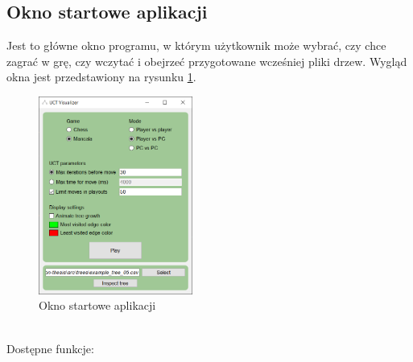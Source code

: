 \documentclass{article}
\begin{document}
\subsection{Okno startowe aplikacji}
Jest to główne okno programu, w którym użytkownik może wybrać, czy chce zagrać w grę, czy wczytać i obejrzeć przygotowane wcześniej pliki drzew. Wygląd okna jest przedstawiony na rysunku \ref{rys:mainappwindow}.
\begin{figure}[h]
	\centering
	\includegraphics[width=0.45\textwidth]{main-app-window}
	\caption{Okno startowe aplikacji}
	\label{rys:mainappwindow}
\end{figure}\\
Dostępne funkcje:\\
\end{document}
